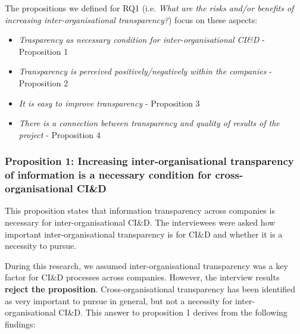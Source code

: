 The propositions we defined for  
RQ1 (i.e. {\em What are the risks and/or benefits of increasing inter-organisational transparency?}) focus on these aspects:

\begin{itemize}
\item {\em Trasparency as necessary condition for  inter-organisational CI\&D}  - Proposition 1 %
\item {\em Transparency is perceived positively/negatively within the companies} - Proposition 2 %
\item {\em It is easy to improve transparency} - Proposition 3 %
\item {\em There is a connection between transparency and quality of results of the project} - Proposition 4 %
\end{itemize}

\vspace{.2cm}
\subsubsection{Proposition 1: Increasing inter-organisational transparency of information is a necessary condition for cross-organisational CI\&D}

This proposition states that information transparency across companies is necessary for inter-organisational CI\&D. The interviewees were asked how important inter-organisational transparency is for CI\&D and whether it is a necessity to pursue. 

During this research, we assumed inter-organisational transparency was a key factor for CI\&D processes across companies. However, the interview results {\bf reject the proposition}. Cross-organisational transparency has been identified as very important to pursue in general, but not a necessity for inter-organisational CI\&D. This answer to proposition 1 derives from the following findings:


